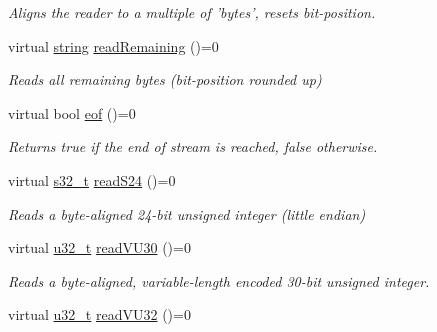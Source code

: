 \begin{DoxyCompactItemize}
\begin{DoxyCompactList}\small\item\em Aligns the reader to a multiple of 'bytes', resets bit-\/position. \end{DoxyCompactList}\item 
\hypertarget{classjswf_1_1io_1_1_generic_reader_a35ef3dad6e2c5b36a2a3214a9b0e4272}{virtual \hyperlink{namespacejswf_a755127d61081aa8af105eb800aa2c1ec}{string} \hyperlink{classjswf_1_1io_1_1_generic_reader_a35ef3dad6e2c5b36a2a3214a9b0e4272}{read\+Remaining} ()=0}\label{classjswf_1_1io_1_1_generic_reader_a35ef3dad6e2c5b36a2a3214a9b0e4272}

\begin{DoxyCompactList}\small\item\em Reads all remaining bytes (bit-\/position rounded up) \end{DoxyCompactList}\item 
\hypertarget{classjswf_1_1io_1_1_generic_reader_a11588c67c62d3fa46690a024cb0405ff}{virtual bool \hyperlink{classjswf_1_1io_1_1_generic_reader_a11588c67c62d3fa46690a024cb0405ff}{eof} ()=0}\label{classjswf_1_1io_1_1_generic_reader_a11588c67c62d3fa46690a024cb0405ff}

\begin{DoxyCompactList}\small\item\em Returns true if the end of stream is reached, false otherwise. \end{DoxyCompactList}\item 
\hypertarget{classjswf_1_1io_1_1_generic_reader_ac09240cd1e70fe0e020a301217d4fb2b}{virtual \hyperlink{namespacejswf_a19b2a5980fe3b05994a2127a3c7e0521}{s32\+\_\+t} \hyperlink{classjswf_1_1io_1_1_generic_reader_ac09240cd1e70fe0e020a301217d4fb2b}{read\+S24} ()=0}\label{classjswf_1_1io_1_1_generic_reader_ac09240cd1e70fe0e020a301217d4fb2b}

\begin{DoxyCompactList}\small\item\em Reads a byte-\/aligned 24-\/bit unsigned integer (little endian) \end{DoxyCompactList}\item 
\hypertarget{classjswf_1_1io_1_1_generic_reader_ae93752df73846ca760e748f22612c88f}{virtual \hyperlink{namespacejswf_ae68dd480b6437e9a20db7b004283a466}{u32\+\_\+t} \hyperlink{classjswf_1_1io_1_1_generic_reader_ae93752df73846ca760e748f22612c88f}{read\+V\+U30} ()=0}\label{classjswf_1_1io_1_1_generic_reader_ae93752df73846ca760e748f22612c88f}

\begin{DoxyCompactList}\small\item\em Reads a byte-\/aligned, variable-\/length encoded 30-\/bit unsigned integer. \end{DoxyCompactList}\item 
\hypertarget{classjswf_1_1io_1_1_generic_reader_ade48eb74c708f1611c74aaa787da2754}{virtual \hyperlink{namespacejswf_ae68dd480b6437e9a20db7b004283a466}{u32\+\_\+t} \hyperlink{classjswf_1_1io_1_1_generic_reader_ade48eb74c708f1611c74aaa787da2754}{read\+V\+U32} ()=0}\label{classjswf_1_1io_1_1_generic_reader_ade48eb74c708f1611c74aaa787da2754}


\end{DoxyCompactItemize}
